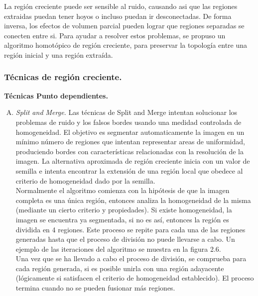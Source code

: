 \documentclass[12pt]{report}
\begin{document}
La región creciente puede ser sensible al ruido, causando asi que las regiones extraidas puedan tener hoyos o incluso puedan ir desconectadas. De forma inversa, los efectos de volumen parcial pueden lograr que regiones separadas se conecten entre si. Para ayudar a resolver estos problemas, se propuso un algoritmo homotópico de región creciente, para preservar la topología entre una región inicial y una región extraída.

\subsubsection{Técnicas de región creciente.}
\textbf{ Técnicas Punto dependientes.}
\begin{enumerate}[A.]
\item \textit{Split and Merge.}
Las técnicas de Split and Merge intentan solucionar los problemas de ruido y los falsos bordes usando una medidad controlada de homogeneidad. El objetivo es segmentar automaticamente la imagen en un mínimo número de regiones que intentan representar areas de uniformidad, produciendo bordes con características relacionadas con la resolución de la imagen. La alternativa aproximada de región creciente inicia con un valor de semilla e intenta encontrar la extensión de una región local que obedece al criterio de homogeneidad dado por la semilla.\\

Normalmente el algoritmo comienza con la hipótesis de que la imagen completa es una única región, entonces analiza la homogeneidad de la misma (mediante un cierto criterio y propiedades). Si existe homogeneidad, la imagen se encuentra ya segmentada, si no es así, entonces la región es dividida en 4 regiones.
Este proceso se repite para cada una de las regiones generadas hasta que el proceso de división no puede llevarse a cabo. Un ejemplo de las iteraciones del algoritmo se muestra en la figura 2.6.\\

Una vez que se ha llevado a cabo el proceso de división, se comprueba para cada región generada, si es posible unirla con una región adayacente (lógicamente si satisfacen el criterio de homogeneidad establecido). El proceso termina cuando no se pueden fusionar más regiones.\cite{split}


\end{enumerate}
\end{document}
